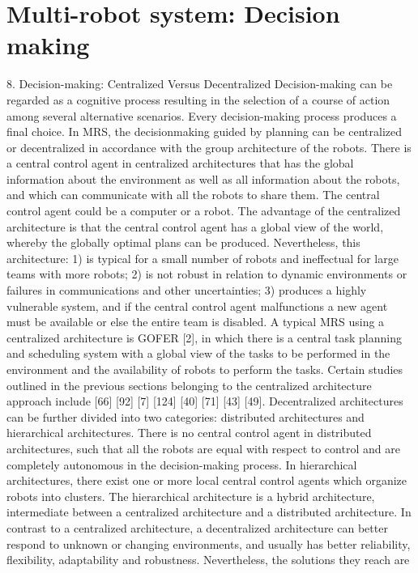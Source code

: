 \section{Multi-robot system: Decision making}
8. Decision-making: Centralized Versus Decentralized
Decision-making can be regarded as a cognitive process
resulting in the selection of a course of action among
several alternative scenarios. Every decision-making
process produces a final choice. In MRS, the decisionmaking guided by planning can be centralized or
decentralized in accordance with the group architecture
of the robots.
There is a central control agent in centralized architectures
that has the global information about the environment as
well as all information about the robots, and which can
communicate with all the robots to share them. The central
control agent could be a computer or a robot. The
advantage of the centralized architecture is that the central
control agent has a global view of the world, whereby the
globally optimal plans can be produced. Nevertheless, this
architecture: 1) is typical for a small number of robots and
ineffectual for large teams with more robots; 2) is not
robust in relation to dynamic environments or failures in
communications and other uncertainties; 3) produces a
highly vulnerable system, and if the central control agent
malfunctions a new agent must be available or else the
entire team is disabled. A typical MRS using a centralized
architecture is GOFER [2], in which there is a central task
planning and scheduling system with a global view of the
tasks to be performed in the environment and the
availability of robots to perform the tasks. Certain studies
outlined in the previous sections belonging to the
centralized architecture approach include [66] [92] [7] [124]
[40] [71] [43] [49].
Decentralized architectures can be further divided into
two categories: distributed architectures and hierarchical
architectures. There is no central control agent in
distributed architectures, such that all the robots are
equal with respect to control and are completely
autonomous in the decision-making process. In
hierarchical architectures, there exist one or more local
central control agents which organize robots into clusters.
The hierarchical architecture is a hybrid architecture,
intermediate between a centralized architecture and a
distributed architecture. In contrast to a centralized
architecture, a decentralized architecture can better
respond to unknown or changing environments, and
usually has better reliability, flexibility, adaptability and
robustness. Nevertheless, the solutions they reach are
